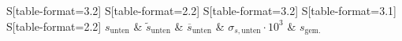 \begin{table}
    \centering
    \caption{Berechnete Abstände der Löcher $s_\text{unten}, \tilde{s}_\text{unten}$ zur unteren Kante, ihr Mittelwert $\overline{s}_\text{unten}$ mit dem Fehler $\sigma_{s,\text{unten}}$ und der gemessene Wert $s_\text{gem.}$, alle Werte in \si{\milli\meter}}
    \label{tab:UntenGanz}
    \begin{tabular}{
	S[table-format=3.2]
	S[table-format=2.2]
	S[table-format=3.2]
	S[table-format=3.1]
	S[table-format=2.2]
	}
	\toprule
	{$s_\text{unten}$}		& {$\tilde{s}_\text{unten}$}		& 
	{$\overline{s}_\text{unten}$}		& {$\sigma_{s,\text{unten}}\cdot 10^3$}		& 
	{$s_\text{gem.}$}		\\ 
	\midrule
    
    \bottomrule
    \end{tabular}
    \end{table}

